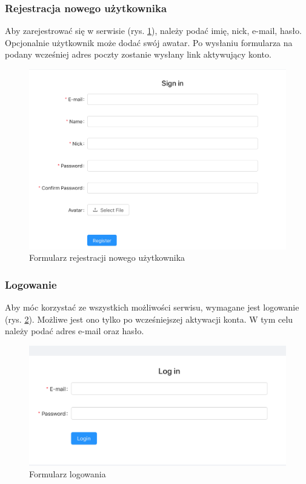 \documentclass[declaration,shortabstract,polish,inz]{iithesis}
\begin{document}
\subsubsection{Rejestracja nowego użytkownika}
Aby zarejestrować się w serwisie (rys. \ref{fig:register}), należy podać imię, nick, e-mail, hasło. Opcjonalnie użytkownik może dodać swój awatar. Po wysłaniu formularza na podany wcześniej adres poczty zostanie wysłany link aktywujący konto.

\begin{figure}[H]
    \centering
    \includegraphics[width=\textwidth]{images/rejestracja2.png}
    \caption{Formularz rejestracji nowego użytkownika}
    \label{fig:register}
\end{figure}

\subsubsection{Logowanie}
Aby móc korzystać ze wszystkich możliwości serwisu, wymagane jest logowanie (rys. \ref{fig:login}). Możliwe jest ono tylko po wcześniejszej aktywacji konta. W tym celu należy podać adres e-mail oraz hasło.

\begin{figure}[H]
    \centering
    \includegraphics[width=\linewidth]{images/logowanie.png}
    \caption{Formularz logowania}
    \label{fig:login}
\end{figure}
\end{document}
